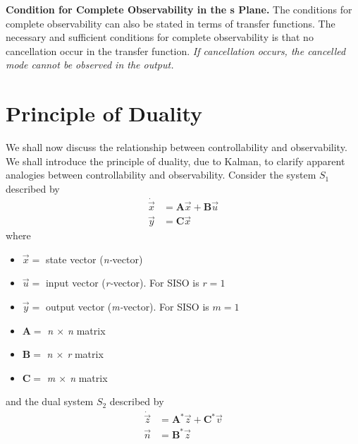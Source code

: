 \documentclass[11pt,a4paper,oneside]{book}
\numberwithin{equation}{section}
\theoremstyle{it}
\theoremstyle{definition}
\begin{document}
\vspace{5mm}
\textbf{Condition for Complete Observability in the s Plane.} The conditions 
for complete observability can also be stated in terms of transfer functions. 
The necessary and sufficient conditions for complete observability is that no 
cancellation occur in the transfer function. \textit{If cancellation occurs, 
the cancelled mode cannot be observed in the output.}

\section{Principle of Duality}
We shall now discuss the relationship between controllability and 
observability. We shall introduce the principle of duality, due to Kalman, to 
clarify apparent analogies between controllability and observability.
Consider the system $S_1$ described by
\begin{equation} 
	\begin{split}
		\dot{\vec x} & = \mathbf{A}\vec x + \mathbf{B}\vec u \\
		\vec y & = \mathbf{C}\vec x
	\end{split}
\end{equation}
where	\begin{itemize} 
	\item $\vec x = $ state vector (\textit{n-}vector)
	\item $\vec u = $ input vector (\textit{r-}vector). For SISO is $r=1$
	\item $\vec y = $ output vector (\textit{m-}vector). For SISO is $m=1$
	\item $ \mathbf{A} = $ \textit{n $\times$ n} matrix
	\item $ \mathbf{B} = $ \textit{n $\times$ r} matrix
	\item $ \mathbf{C} = $ \textit{m $\times$ n} matrix
\end{itemize}
and the dual system $S_2$ described by
\begin{equation} 
	\begin{split}
		\dot{\vec z} & = \textbf{A}^*\vec z + \textbf{C}^*\vec v \\
		\vec n & = \mathbf{B}^*\vec z
	\end{split}
\end{equation}
\end{document}
